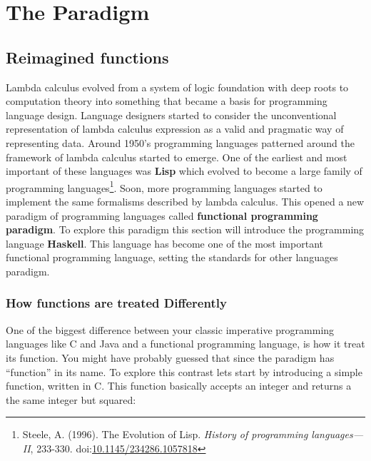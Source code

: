 \section{The
Paradigm}\label{functional-programming-paradigm.md__the-paradigm}

\subsection{Reimagined
functions}\label{functional-programming-paradigm.md__reimagined-functions}

Lambda calculus evolved from a system of logic foundation with deep
roots to computation theory into something that became a basis for
programming language design. Language designers started to consider the
unconventional representation of lambda calculus expression as a valid
and pragmatic way of representing data. Around 1950's programming
languages patterned around the framework of lambda calculus started to
emerge. One of the earliest and most important of these languages was
\textbf{Lisp} which evolved to become a large family of programming
languages\footnote{Steele, A. (1996). The Evolution of Lisp.
  \emph{History of programming languages---II}, 233-330.
  doi:\href{https://doi.org/10.1145/234286.1057818}{10.1145/234286.1057818}}.
Soon, more programming languages started to implement the same
formalisms described by lambda calculus. This opened a new paradigm of
programming languages called \textbf{functional programming paradigm}.
To explore this paradigm this section will introduce the programming
language \textbf{Haskell}. This language has become one of the most
important functional programming language, setting the standards for
other languages paradigm.

\subsubsection{How functions are treated
Differently}\label{functional-programming-paradigm.md__how-functions-are-treated-differently}

One of the biggest difference between your classic imperative
programming languages like C and Java and a functional programming
language, is how it treat its function. You might have probably guessed
that since the paradigm has ``function'' in its name. To explore this
contrast lets start by introducing a simple function, written in C. This
function basically accepts an integer and returns a the same integer but
squared:


